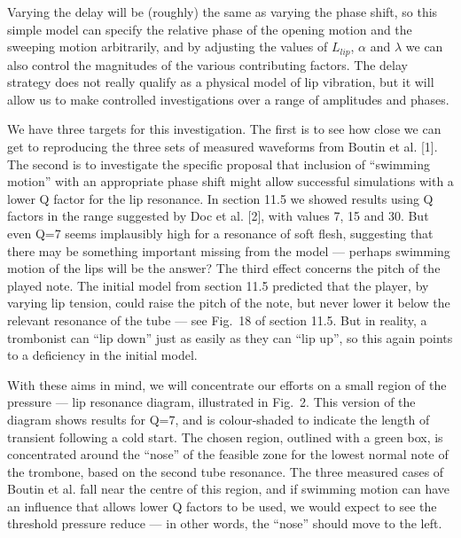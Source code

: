   Varying the delay will be (roughly) the same as varying the phase shift, so 
  this simple model can specify the relative phase of the opening motion and 
  the sweeping motion arbitrarily, and by adjusting the values of $L_{lip}$, 
  $\alpha$ and $\lambda$ we can also control the magnitudes of the various 
  contributing factors. The delay strategy does not really qualify as a 
  physical model of lip vibration, but it will allow us to make controlled 
  investigations over a range of amplitudes and phases. 

  We have three targets for this investigation. The first is to see how close 
  we can get to reproducing the three sets of measured waveforms from Boutin et 
  al. [1]. The second is to investigate the specific proposal that inclusion of 
  ``swimming motion'' with an appropriate phase shift might allow successful 
  simulations with a lower Q factor for the lip resonance. In section 11.5 we 
  showed results using Q factors in the range suggested by Doc et al. [2], with 
  values 7, 15 and 30. But even Q=7 seems implausibly high for a resonance of 
  soft flesh, suggesting that there may be something important missing from the 
  model --- perhaps swimming motion of the lips will be the answer? The third 
  effect concerns the pitch of the played note. The initial model from section 
  11.5 predicted that the player, by varying lip tension, could raise the pitch 
  of the note, but never lower it below the relevant resonance of the tube --- 
  see Fig.\ 18 of section 11.5. But in reality, a trombonist can ``lip down'' 
  just as easily as they can ``lip up'', so this again points to a deficiency 
  in the initial model. 

  With these aims in mind, we will concentrate our efforts on a small region of 
  the pressure --- lip resonance diagram, illustrated in Fig.\ 2. This version 
  of the diagram shows results for Q=7, and is colour-shaded to indicate the 
  length of transient following a cold start. The chosen region, outlined with 
  a green box, is concentrated around the ``nose'' of the feasible zone for the 
  lowest normal note of the trombone, based on the second tube resonance. The 
  three measured cases of Boutin et al. fall near the centre of this region, 
  and if swimming motion can have an influence that allows lower Q factors to 
  be used, we would expect to see the threshold pressure reduce — in other 
  words, the ``nose'' should move to the left. 

